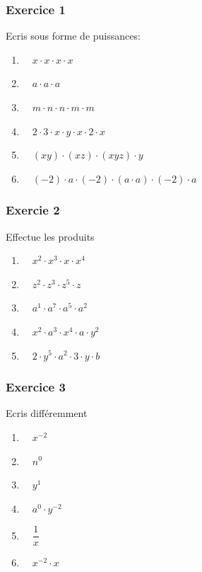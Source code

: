 \documentclass[
  12pt,
]{book}
\providecommand{\tightlist}{%
  \setlength{\itemsep}{0pt}\setlength{\parskip}{0pt}}
\begin{document}
\hypertarget{exercice-1}{%
\subsubsection*{Exercice 1}\label{exercice-1}}

Ecris sous forme de puissances:

\begin{enumerate}
\tightlist
\item
  \(\quad x\cdot x\cdot x\cdot x\)
\item
  \(\quad a\cdot a\cdot a\)
\item
  \(\quad m\cdot n\cdot n\cdot m\cdot m\)
\item
  \(\quad 2\cdot 3\cdot x\cdot y\cdot x\cdot 2\cdot x\)
\item
  \(\quad (xy)\cdot (xz)\cdot (xyz)\cdot y\)
\item
  \(\quad (-2)\cdot a\cdot(-2)\cdot(a\cdot a)\cdot(-2)\cdot a\)
\end{enumerate}

\hypertarget{exercie-2}{%
\subsubsection*{Exercie 2}\label{exercie-2}}

Effectue les produits

\begin{enumerate}
\def\labelenumi{\arabic{enumi}.}
\tightlist
\item
  \(\quad x^2\cdot x^3\cdot x\cdot x^4\)
\item
  \(\quad z^2\cdot z^3\cdot z^5\cdot z\)
\item
  \(\quad a^1\cdot a^7\cdot a^5\cdot a^2\)
\item
  \(\quad x^2\cdot a^3\cdot x^4\cdot a\cdot y^2\)
\item
  \(\quad 2\cdot y^5\cdot a^2\cdot 3\cdot y\cdot b\)
\end{enumerate}

\hypertarget{exercice-3}{%
\subsubsection*{Exercice 3}\label{exercice-3}}

Ecris différemment

\begin{enumerate}
\def\labelenumi{\arabic{enumi}.}
\tightlist
\item
  \(\quad x^{-2}\)
\item
  \(\quad n^0\)
\item
  \(\quad y^1\)
\item
  \(\quad a^0\cdot y^{-2}\)
\item
  \(\quad \dfrac{1}{x}\)
\item
  \(\quad x^{-2}\cdot x\)
\end{enumerate}
\end{document}
